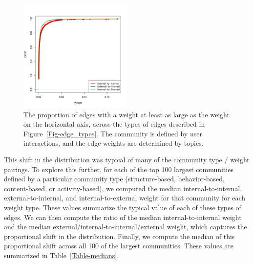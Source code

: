 \begin{figure}[ht]
  \centering
\includegraphics[width=0.50\textwidth]{Figures/comm0_labels-mention-retweet_weights-hashtag-ecdf.pdf}
\caption{The proportion of edges with a weight at least as large as the weight on the horizontal axis, across the types of edges described in Figure~\ref{Fig-edge_types}. The community is defined by user interactions, and the edge weights are determined by topics.}
\label{Fig-dist_across_community}
\end{figure}

This shift in the distribution was typical of many of the community type / weight pairings. To explore this further, for each of the top 100 largest communities defined by a particular community type (structure-based, behavior-based, content-based, or activity-based), we computed the median internal-to-internal, external-to-internal, and internal-to-external weight for that community for each weight type. These values summarize the typical value of each of these types of edges. We can then compute the ratio of the median internal-to-internal weight and the median external/internal-to-internal/external weight, which captures the proportional shift in the distribution. Finally, we compute the median of this proportional shift across all 100 of the largest communities. These values are summarized in Table~\ref{Table-medians}.


